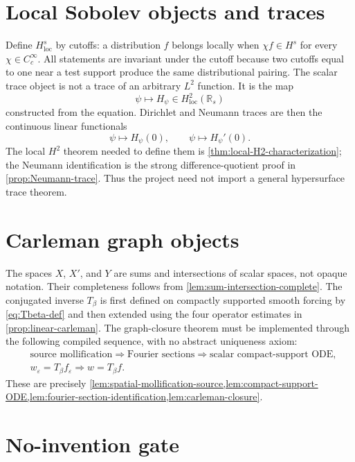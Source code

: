 \documentclass[11pt,oneside]{book}
\theoremstyle{definition}
\theoremstyle{remark}
\newcommand{\R}{\mathbb R}
\newcommand{\1}{\mathbf 1}
\newcommand{\loc}{\mathrm{loc}}
\newcommand{\eps}{\varepsilon}
\begin{document}
\section{Local Sobolev objects and traces}

Define $H^s_{\loc}$ by cutoffs: a distribution $f$ belongs locally when
$\chi f\in H^s$ for every $\chi\in C_c^\infty$.  All statements are invariant
under the cutoff because two cutoffs equal to one near a test support produce
the same distributional pairing.  The scalar trace object is not a trace of
an arbitrary $L^2$ function.  It is the map
\[
 \psi\longmapsto H_\psi\in H^2_{\loc}(\R_s)
\]
constructed from the equation.  Dirichlet and Neumann traces are then the
continuous linear functionals
\[
 \psi\longmapsto H_\psi(0),
 \qquad
 \psi\longmapsto H_\psi'(0).
\]
The local $H^2$ theorem needed to define them is
\cref{thm:local-H2-characterization}; the Neumann identification is the
strong difference-quotient proof in \cref{prop:Neumann-trace}.  Thus the
project need not import a general hypersurface trace theorem.

\section{Carleman graph objects}

The spaces $X$, $X'$, and $Y$ are sums and intersections of scalar spaces,
not opaque notation.  Their completeness follows from
\cref{lem:sum-intersection-complete}.  The conjugated inverse $T_\beta$ is
first defined on compactly supported smooth forcing by
\eqref{eq:Tbeta-def} and then extended using the four operator estimates in
\cref{prop:linear-carleman}.  The graph-closure theorem must be implemented
through the following compiled sequence, with no abstract uniqueness axiom:
\begin{align*}
 &\text{source mollification}
   \Longrightarrow \text{Fourier sections}
   \Longrightarrow \text{scalar compact-support ODE},\\
 &w_\eps=T_\beta f_\eps
   \Longrightarrow w=T_\beta f.
\end{align*}
These are precisely
\cref{lem:spatial-mollification-source,lem:compact-support-ODE,lem:fourier-section-identification,lem:carleman-closure}.

\section{No-invention gate}
\end{document}
